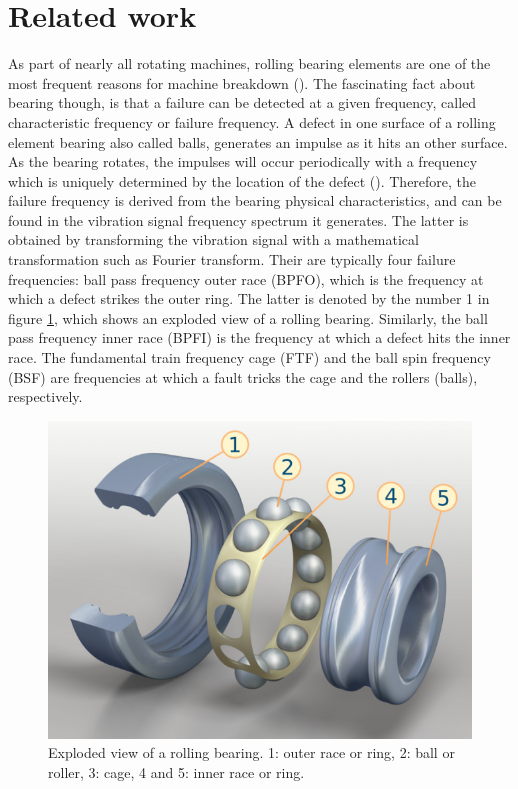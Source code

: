 \documentclass[../Main/thesis.tex]{subfiles}
\begin{document}
\section{Related work}
\label{sec:relatedwork}
As part of nearly all rotating machines, rolling bearing elements are one of the most frequent reasons for machine breakdown (\cite{randal2010}). The fascinating fact about bearing though, is that a failure can be detected at a given frequency, called characteristic frequency or failure frequency. A defect in one surface of a rolling element bearing also called balls, generates an impulse as it hits an other surface. As the bearing rotates, the impulses will occur periodically with a frequency which is uniquely determined by the location of the defect (\cite{mcfadden1984}). Therefore, the failure frequency
is derived from the bearing physical characteristics, and can be found in the vibration signal frequency spectrum it generates. The latter is obtained by transforming the vibration signal with a mathematical transformation such as Fourier transform. 
\justify
Their are typically four failure frequencies: ball pass frequency outer race (BPFO), which is the frequency at which a defect strikes the outer ring. The latter is denoted by the number 1 in figure \ref{fig:bearing-s}, which shows an exploded view of a rolling bearing. Similarly, the ball pass frequency inner race (BPFI) is the frequency at which a defect hits the inner race. The fundamental train frequency cage (FTF) and the ball spin frequency (BSF) are frequencies at which a fault tricks the cage and the rollers (balls), respectively. 
 
\begin{figure}[H]
	\centering
	\includegraphics[width=0.5\linewidth]{../fig/bearing-s}
	\caption{Exploded view of a rolling bearing. 1: outer race or ring, 2: ball or roller, 3: cage, 4 and 5: inner race or ring.}
	\label{fig:bearing-s}
\end{figure}
\end{document}
